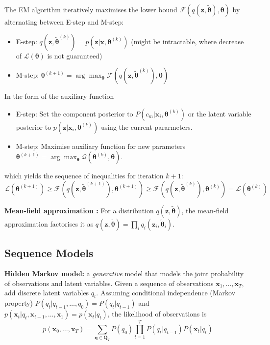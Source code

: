 \documentclass[12pt]{article}
\begin{document}
The EM algorithm iteratively maximises the lower bound $\mathcal{F}(q(\boldsymbol{z},\boldsymbol{\tilde{\theta}}), \boldsymbol{\theta})$ by alternating between E-step and M-step:
\begin{itemize}
    \item E-step: $q(\boldsymbol{z},\boldsymbol{\tilde{\theta}}^{(k)}) = p(\boldsymbol{z} | \boldsymbol{x}, \boldsymbol{\theta}^{(k)})$ (might be intractable, where decrease of $\mathcal{L}(\boldsymbol{\theta})$ is not guaranteed)
    \item M-step: $\boldsymbol{\theta}^{(k+1)} = \arg\max_{\boldsymbol{\theta}} \mathcal{F}(q(\boldsymbol{z},\boldsymbol{\tilde{\theta}}^{(k)}), \boldsymbol{\theta})$
\end{itemize}
In the form of the auxiliary function
\begin{itemize}
    \item E-step: Set the component posterior to $P(c_m | \boldsymbol{x}_i, \boldsymbol{\theta}^{(k)})$ or the latent variable posterior to $p(\boldsymbol{z} | \boldsymbol{x}_i, \boldsymbol{\theta}^{(k)})$ using the current pararmeters.
    \item M-step:  Maximise auxiliary function for new parameters $\boldsymbol{\theta}^{(k+1)} = \arg\max_{\boldsymbol{\theta}} \mathcal{Q}(\boldsymbol{\theta}^{(k)}, \boldsymbol{\theta})$.
\end{itemize}
which yields the sequence of inequalities for iteration $k+1$:
$$
\mathcal{L}(\boldsymbol{\theta}^{(k+1)}) \geq \mathcal{F}(q(\boldsymbol{z},\boldsymbol{\tilde{\theta}}^{(k+1)}), \boldsymbol{\theta}^{(k+1)}) \geq \mathcal{F}(q(\boldsymbol{z},\boldsymbol{\tilde{\theta}}^{(k)}), \boldsymbol{\theta}^{(k)}) = \mathcal{L}(\boldsymbol{\theta}^{(k)})
$$

\textbf{Mean-field approximation :} For a distribution $q(\boldsymbol{z},\boldsymbol{\tilde{\theta}})$, the mean-field approximation factorises it as $q(\boldsymbol{z},\boldsymbol{\tilde{\theta}}) = \prod_i q_i(\boldsymbol{z}_i, \boldsymbol{\tilde{\theta}}_i)$.

\subsection{Sequence Models}
\textbf{Hidden Markov model:} a \textit{generative} model that models the joint probability of observations and latent variables. 
Given a sequence of observations $\boldsymbol{x}_1, \dots, \boldsymbol{x}_T$, add discrete latent variables $q_t$. Assuming conditional independence (Markov property) $P(q_t | q_{t-1}, \dots, q_0) = P(q_t | q_{t-1})$ and $p(\boldsymbol{x}_t | q_t, \boldsymbol{x}_{t-1}, \dots, \boldsymbol{x}_1) = p(\boldsymbol{x}_t | q_t)$, the likelihood of observations is
$$
p(\boldsymbol{x}_0, \dots, \boldsymbol{x}_T) = \sum_{\boldsymbol{q} \in \boldsymbol{Q}_T} P(q_0) \prod_{t=1}^T P(q_t | q_{t-1}) P(\boldsymbol{x}_t | q_t)
$$
\end{document}
